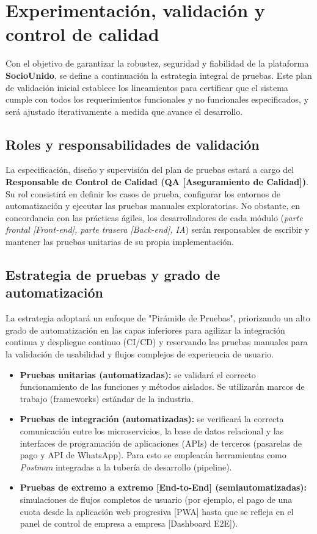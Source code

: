 \section{Experimentación, validación y control de calidad}

Con el objetivo de garantizar la robustez, seguridad y fiabilidad de la plataforma \textbf{SocioUnido}, se define a continuación la estrategia integral de pruebas. Este plan de validación inicial establece los lineamientos para certificar que el sistema cumple con todos los requerimientos funcionales y no funcionales especificados, y será ajustado iterativamente a medida que avance el desarrollo.

\subsection{Roles y responsabilidades de validación}

La especificación, diseño y supervisión del plan de pruebas estará a cargo del \textbf{Responsable de Control de Calidad (QA [Aseguramiento de Calidad])}. Su rol consistirá en definir los casos de prueba, configurar los entornos de automatización y ejecutar las pruebas manuales exploratorias. No obstante, en concordancia con las prácticas ágiles, los desarrolladores de cada módulo (\textit{parte frontal [Front-end], parte trasera [Back-end], IA}) serán responsables de escribir y mantener las pruebas unitarias de su propia implementación.

\subsection{Estrategia de pruebas y grado de automatización}

La estrategia adoptará un enfoque de "Pirámide de Pruebas", priorizando un alto grado de automatización en las capas inferiores para agilizar la integración continua y despliegue continuo (CI/CD) y reservando las pruebas manuales para la validación de usabilidad y flujos complejos de experiencia de usuario.

\begin{itemize}
    \item \textbf{Pruebas unitarias (automatizadas):} se validará el correcto funcionamiento de las funciones y métodos aislados. Se utilizarán marcos de trabajo (frameworks) estándar de la industria.
    \item \textbf{Pruebas de integración (automatizadas):} se verificará la correcta comunicación entre los microservicios, la base de datos relacional y las interfaces de programación de aplicaciones (APIs) de terceros (pasarelas de pago y API de WhatsApp). Para esto se emplearán herramientas como \textit{Postman} integradas a la tubería de desarrollo (pipeline).
    \item \textbf{Pruebas de extremo a extremo [End-to-End] (semiautomatizadas):} simulaciones de flujos completos de usuario (por ejemplo, el pago de una cuota desde la aplicación web progresiva [PWA] hasta que se refleja en el panel de control de empresa a empresa [Dashboard E2E]).
\end{itemize}

